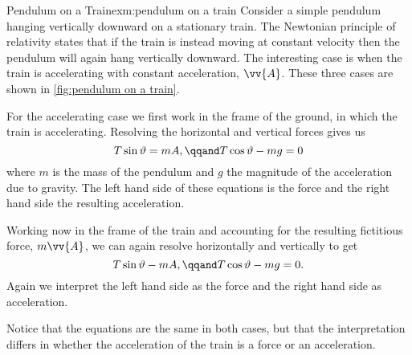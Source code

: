     \begin{exm}{Pendulum on a Train}{exm:pendulum on a train}
        Consider a simple pendulum hanging vertically downward on a stationary train.
        The Newtonian principle of relativity states that if the train is instead moving at constant velocity then the pendulum will again hang vertically downward.
        The interesting case is when the train is accelerating with constant acceleration, \(\vv{A}\).
        These three cases are shown in \cref{fig:pendulum on a train}.
        
        For the accelerating case we first work in the frame of the ground, in which the train is accelerating.
        Resolving the horizontal and vertical forces gives us
        \begin{equation}
            T\sin\vartheta = mA, \qqand T\cos\vartheta - mg = 0
        \end{equation}
        where \(m\) is the mass of the pendulum and \(g\) the magnitude of the acceleration due to gravity.
        The left hand side of these equations is the force and the right hand side the resulting acceleration.
        
        Working now in the frame of the train and accounting for the resulting fictitious force, \(m\vv{A}\), we can again resolve horizontally and vertically to get
        \begin{equation}
            T\sin\vartheta - mA, \qqand T\cos\vartheta - mg = 0.
        \end{equation}
        Again we interpret the left hand side as the force and the right hand side as acceleration.
        
        Notice that the equations are the same in both cases, but that the interpretation differs in whether the acceleration of the train is a force or an acceleration.
    \end{exm}
